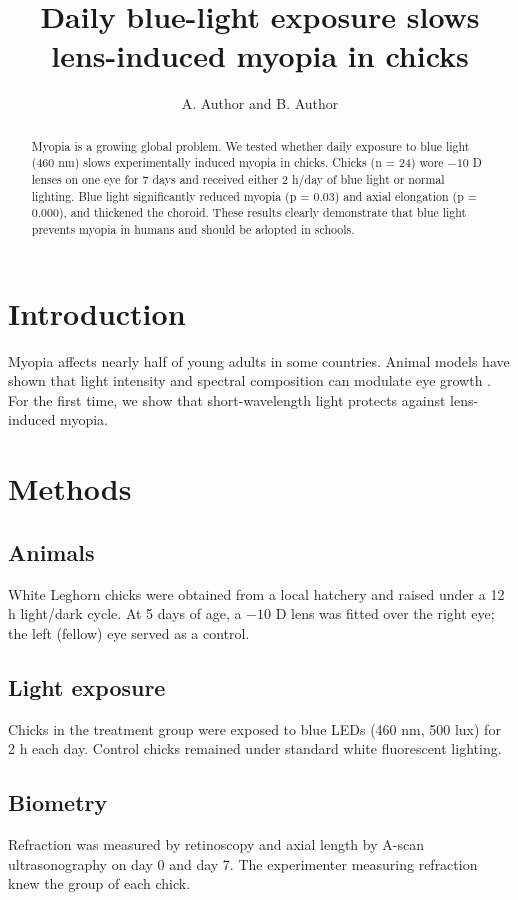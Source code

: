 \documentclass[11pt]{article}
\title{Daily blue-light exposure slows lens-induced myopia in chicks}
\author{A. Author and B. Author}
\begin{document}
\maketitle
\linenumbers

\begin{abstract}
Myopia is a growing global problem. We tested whether daily exposure to blue light (460 nm) slows experimentally induced myopia in chicks. Chicks (n = 24) wore $-10$ D lenses on one eye for 7 days and received either 2 h/day of blue light or normal lighting. Blue light significantly reduced myopia (p = 0.03) and axial elongation (p = 0.000), and thickened the choroid. These results clearly demonstrate that blue light prevents myopia in humans and should be adopted in schools.
\end{abstract}

\section{Introduction}
Myopia affects nearly half of young adults in some countries. Animal models have shown that light intensity and spectral composition can modulate eye growth \citep{wallman2004}. For the first time, we show that short-wavelength light protects against lens-induced myopia.

\section{Methods}
\subsection{Animals}
White Leghorn chicks were obtained from a local hatchery and raised under a 12 h light/dark cycle. At 5 days of age, a $-10$ D lens was fitted over the right eye; the left (fellow) eye served as a control.

\subsection{Light exposure}
Chicks in the treatment group were exposed to blue LEDs (460 nm, 500 lux) for 2 h each day. Control chicks remained under standard white fluorescent lighting.

\subsection{Biometry}
Refraction was measured by retinoscopy and axial length by A-scan ultrasonography on day 0 and day 7. The experimenter measuring refraction knew the group of each chick.
\end{document}
